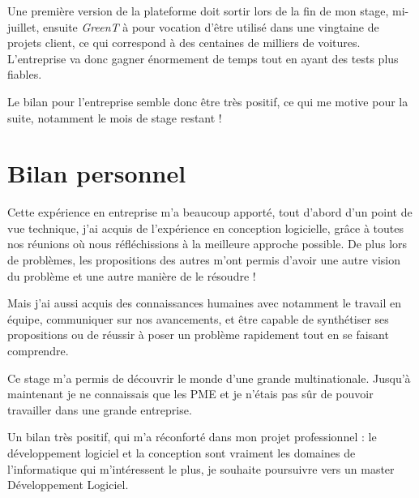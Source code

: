 	Une première version de la plateforme doit sortir lors de la fin de mon stage, mi-juillet, ensuite \textit{GreenT} à pour vocation d'être utilisé dans une vingtaine de projets client, ce qui correspond à des centaines de milliers de voitures. L'entreprise va donc gagner énormement de temps tout en ayant des tests plus fiables.

	Le bilan pour l'entreprise semble donc être très positif, ce qui me motive pour la suite, notamment le mois de stage restant !

	\section{Bilan personnel}
	Cette expérience en entreprise m'a beaucoup apporté, tout d'abord d'un point de vue technique, j'ai acquis de l'expérience en conception logicielle, grâce
	à toutes nos réunions où nous réfléchissions à la meilleure approche possible. De plus lors de problèmes, les propositions des autres m'ont permis d'avoir
	une autre vision du problème et une autre manière de le résoudre !

	Mais j'ai aussi acquis des connaissances humaines avec notamment le travail en équipe, communiquer sur nos avancements, et être capable de synthétiser ses
	propositions ou de réussir à poser un problème rapidement tout en se faisant comprendre.

	Ce stage m'a permis de découvrir le monde d'une grande multinationale. Jusqu'à maintenant je ne connaissais que les PME et je n'étais pas sûr de pouvoir
	travailler dans une grande entreprise.

	Un bilan très positif, qui m'a réconforté dans mon projet professionnel : le développement logiciel et la conception sont vraiment les domaines de
	l'informatique qui m'intéressent le plus, je souhaite poursuivre vers un master Développement Logiciel.
